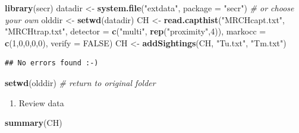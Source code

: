 \documentclass[
]{book}
\newenvironment{Shaded}{\begin{snugshade}}{\end{snugshade}}
\newcommand{\AttributeTok}[1]{\textcolor[rgb]{0.13,0.29,0.53}{#1}}
\newcommand{\CommentTok}[1]{\textcolor[rgb]{0.56,0.35,0.01}{\textit{#1}}}
\newcommand{\ConstantTok}[1]{\textcolor[rgb]{0.56,0.35,0.01}{#1}}
\newcommand{\DecValTok}[1]{\textcolor[rgb]{0.00,0.00,0.81}{#1}}
\newcommand{\FunctionTok}[1]{\textcolor[rgb]{0.13,0.29,0.53}{\textbf{#1}}}
\newcommand{\NormalTok}[1]{#1}
\newcommand{\OtherTok}[1]{\textcolor[rgb]{0.56,0.35,0.01}{#1}}
\newcommand{\StringTok}[1]{\textcolor[rgb]{0.31,0.60,0.02}{#1}}
\providecommand{\tightlist}{%
  \setlength{\itemsep}{0pt}\setlength{\parskip}{0pt}}
\begin{document}
\begin{Shaded}
\begin{Highlighting}[]
\FunctionTok{library}\NormalTok{(secr)}
\NormalTok{datadir }\OtherTok{\textless{}{-}} \FunctionTok{system.file}\NormalTok{(}\StringTok{"extdata"}\NormalTok{, }\AttributeTok{package =} \StringTok{"secr"}\NormalTok{)  }\CommentTok{\# or choose your own}
\NormalTok{olddir }\OtherTok{\textless{}{-}} \FunctionTok{setwd}\NormalTok{(datadir)}
\NormalTok{CH }\OtherTok{\textless{}{-}} \FunctionTok{read.capthist}\NormalTok{(}\StringTok{"MRCHcapt.txt"}\NormalTok{, }\StringTok{"MRCHtrap.txt"}\NormalTok{, }\AttributeTok{detector =} \FunctionTok{c}\NormalTok{(}\StringTok{"multi"}\NormalTok{, }
                    \FunctionTok{rep}\NormalTok{(}\StringTok{"proximity"}\NormalTok{,}\DecValTok{4}\NormalTok{)), }\AttributeTok{markocc =} \FunctionTok{c}\NormalTok{(}\DecValTok{1}\NormalTok{,}\DecValTok{0}\NormalTok{,}\DecValTok{0}\NormalTok{,}\DecValTok{0}\NormalTok{,}\DecValTok{0}\NormalTok{), }\AttributeTok{verify =} \ConstantTok{FALSE}\NormalTok{)}
\NormalTok{CH }\OtherTok{\textless{}{-}} \FunctionTok{addSightings}\NormalTok{(CH, }\StringTok{"Tu.txt"}\NormalTok{, }\StringTok{"Tm.txt"}\NormalTok{)}
\end{Highlighting}
\end{Shaded}

\begin{verbatim}
## No errors found :-)
\end{verbatim}

\begin{Shaded}
\begin{Highlighting}[]
\FunctionTok{setwd}\NormalTok{(olddir)   }\CommentTok{\# return to original folder}
\end{Highlighting}
\end{Shaded}

\begin{enumerate}
\def\labelenumi{\arabic{enumi}.}
\setcounter{enumi}{4}
\tightlist
\item
  Review data
\end{enumerate}

\begin{Shaded}
\begin{Highlighting}[]
\FunctionTok{summary}\NormalTok{(CH)}
\end{Highlighting}
\end{Shaded}
\end{document}
